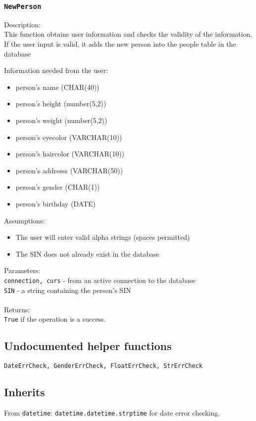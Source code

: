 \documentclass[12pt]{article}
\begin{document}
\subsubsection{\texttt{NewPerson}}
Description:\\
\indent This function obtains user information and checks the
validity of the information.
If the user input is valid, it adds the new person into
the people table in the database

Information needed from the user:
\begin{itemize}
\item person's name (CHAR(40))
\item person's height (number(5,2))
\item person's weight (number(5,2))
\item person's eyecolor (VARCHAR(10))
\item person's haircolor (VARCHAR(10))
\item person's addresss (VARCHAR(50))
\item person's gender (CHAR(1))
\item person's birthday (DATE)
\end{itemize}

\noindent Assumptions:
\begin{itemize}
\item The user will enter valid alpha strings (spaces permitted)
\item The SIN does not already
      exist in the database
\end{itemize}

\noindent Parameters:\\
\indent\texttt{connection, curs} - from an active connection to the database\\
\indent\texttt{SIN} - a string containing the person's SIN\\\\
Returns:\\
\indent \texttt{True} if the operation is a success.
\subsection{Undocumented helper functions}
\texttt{DateErrCheck, GenderErrCheck, FloatErrCheck, StrErrCheck}
\subsection{Inherits}
From \texttt{datetime}: \texttt{datetime.datetime.strptime} for date error checking.
\newpage
\end{document}
